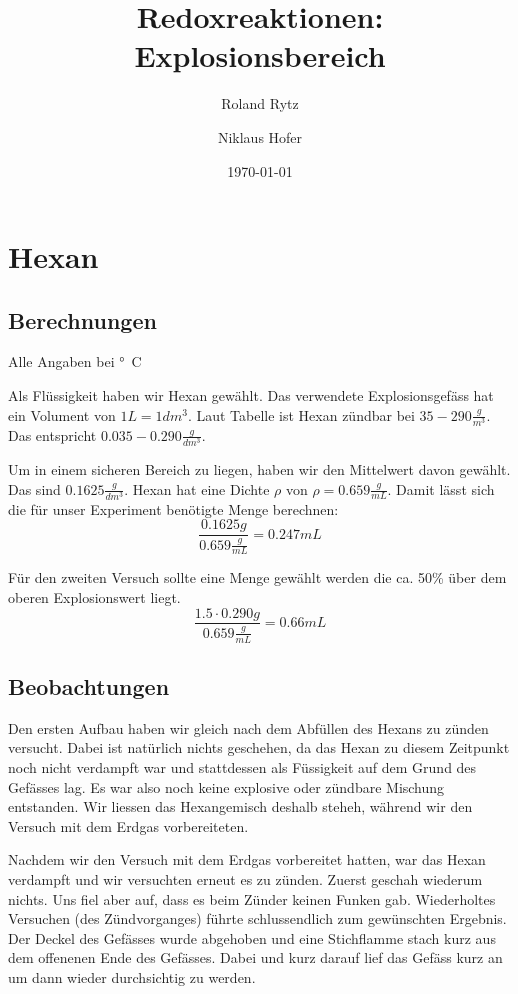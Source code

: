 \documentclass[11pt,paper=a4,final]{scrartcl}
\title{Redoxreaktionen: Explosionsbereich}
\author{Roland Rytz \and Niklaus Hofer}
\date{\today{}}
\begin{document}
\maketitle
\newpage
\tableofcontents
\section{Hexan}
\subsection{Berechnungen}
Alle Angaben bei \unit[20]{°C}

Als Fl\"ussigkeit haben wir Hexan gew\"ahlt. Das verwendete Explosionsgef\"ass
hat ein Volument von \(1L = 1dm^3\). Laut Tabelle ist Hexan z\"undbar
bei \(35-290 \frac{g}{m^3}\). Das entspricht \(0.035 - 0.290 \frac{g}{dm^3}\).

Um in einem sicheren Bereich zu liegen, haben wir den Mittelwert davon
gew\"ahlt. Das sind \(0.1625 \frac{g}{dm^3}\).
Hexan hat eine Dichte \(\rho\) von \(\rho = 0.659 \frac{g}{mL}\). Damit l\"asst
sich die f\"ur unser Experiment ben\"otigte Menge berechnen:
\[ \frac{0.1625g}{0.659\frac{g}{mL}} = 0.247mL \]

F\"ur den zweiten Versuch sollte eine Menge gew\"ahlt werden die ca. 50\% \"uber
dem oberen Explosionswert liegt. 
\[ \frac{1.5 \cdot 0.290g}{0.659\frac{g}{mL}} = 0.66mL \]

\subsection{Beobachtungen}
Den ersten Aufbau haben wir gleich nach dem Abf\"ullen des Hexans zu z\"unden
versucht. Dabei ist nat\"urlich nichts geschehen, da das Hexan zu diesem
Zeitpunkt noch nicht verdampft war und stattdessen als F\"ussigkeit auf dem
Grund des Gef\"asses lag. Es war also noch keine explosive oder z\"undbare
Mischung entstanden. Wir liessen das Hexangemisch deshalb steheh, w\"ahrend wir
den Versuch mit dem Erdgas vorbereiteten.

Nachdem wir den Versuch mit dem Erdgas vorbereitet hatten, war das Hexan
verdampft und wir versuchten erneut es zu z\"unden. Zuerst geschah wiederum
nichts. Uns fiel aber auf, dass es beim Z\"under keinen Funken gab. Wiederholtes
Versuchen (des Z\"undvorganges) f\"uhrte schlussendlich zum gew\"unschten
Ergebnis. Der Deckel des Gef\"asses wurde abgehoben und eine Stichflamme stach
kurz aus dem offenenen Ende des Gef\"asses. Dabei und kurz darauf lief das
Gef\"ass kurz an um dann wieder durchsichtig zu werden.
\end{document}
